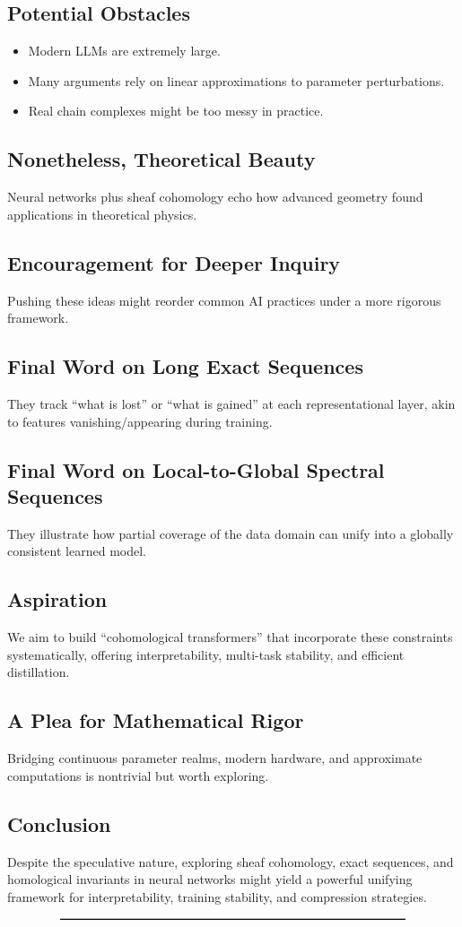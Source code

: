 \documentclass{article}
\begin{document}
\subsection{Potential Obstacles}
\begin{itemize}
\item Modern LLMs are extremely large.
\item Many arguments rely on linear approximations to parameter perturbations.
\item Real chain complexes might be too messy in practice.
\end{itemize}

\subsection{Nonetheless, Theoretical Beauty}
Neural networks plus sheaf cohomology echo how advanced geometry found applications in theoretical physics.

\subsection{Encouragement for Deeper Inquiry}
Pushing these ideas might reorder common AI practices under a more rigorous framework.

\subsection{Final Word on Long Exact Sequences}
They track “what is lost” or “what is gained” at each representational layer, akin to features vanishing/appearing during training.

\subsection{Final Word on Local-to-Global Spectral Sequences}
They illustrate how partial coverage of the data domain can unify into a globally consistent learned model.

\subsection{Aspiration}
We aim to build “cohomological transformers” that incorporate these constraints systematically, offering interpretability, multi-task stability, and efficient distillation.

\subsection{A Plea for Mathematical Rigor}
Bridging continuous parameter realms, modern hardware, and approximate computations is nontrivial but worth exploring.

\subsection{Conclusion}
Despite the speculative nature, exploring sheaf cohomology, exact sequences, and homological invariants in neural networks might yield a powerful unifying framework for interpretability, training stability, and compression strategies.

\[
\rule{0.8\textwidth}{0.6pt}
\]
\end{document}
